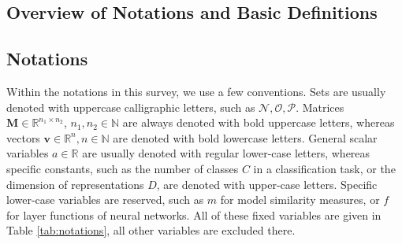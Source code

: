 \documentclass{article}
\newcommand{\Real}{\mathbb{R}}
\begin{document}
\printbibliography[filter=onlymain]



\newpage
\appendix
\begin{refsegment}
\section{Overview of Notations and Basic Definitions}
\label{ap:notations}
\renewcommand{\theequation}{\thesection.\arabic{equation}}
\setcounter{equation}{0}

\subsection{Notations}

Within the notations in this survey, we use a few conventions.
Sets are usually denoted with uppercase calligraphic letters, such as $\mathcal{N},\mathcal{O},\mathcal{P}$.
Matrices $\bm{M}\in\Real^{n_1\times n_2}$, $n_1,n_2\in\mathbb{N}$ are always denoted with bold uppercase letters, whereas vectors $\bm{v}\in\Real^n, n\in\mathbb{N}$ are denoted with bold lowercase letters.
General scalar variables $a\in\Real$ are usually denoted with regular lower-case letters, whereas specific constants, such as the number of classes $C$ in a classification task, or the dimension of representations $D$, are denoted with upper-case letters.
Specific lower-case variables are reserved, such as $m$ for model similarity measures, or $f$ for layer functions of neural networks.
All of these fixed variables are given in Table \ref{tab:notations}, all other variables are excluded there.



\end{refsegment}
\end{document}
